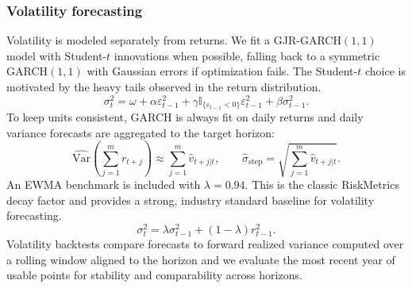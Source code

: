 \documentclass[11pt,a4paper]{article}
\begin{document}
\subsubsection{Volatility forecasting}
Volatility is modeled separately from returns. We fit a GJR-GARCH$(1,1)$ model with Student-$t$ innovations when possible, falling back to a symmetric GARCH$(1,1)$ with Gaussian errors if optimization fails. The Student-$t$ choice is motivated by the heavy tails observed in the return distribution.
\begin{equation}
\sigma_t^2 = \omega + \alpha \varepsilon_{t-1}^2 + \gamma \mathbb{I}_{\{\varepsilon_{t-1}<0\}}\varepsilon_{t-1}^2 + \beta \sigma_{t-1}^2.
\end{equation}
To keep units consistent, GARCH is always fit on daily returns and daily variance forecasts are aggregated to the target horizon:
\begin{equation}
\widehat{\mathrm{Var}}\left(\sum_{j=1}^{m} r_{t+j}\right) \approx \sum_{j=1}^{m} \hat v_{t+j|t},
\qquad
\hat\sigma_{\text{step}} = \sqrt{\sum_{j=1}^{m} \hat v_{t+j|t}}.
\end{equation}
An EWMA benchmark is included with $\lambda=0.94$. This is the classic RiskMetrics decay factor and provides a strong, industry standard baseline for volatility forecasting.
\begin{equation}
\sigma_t^2 = \lambda \sigma_{t-1}^2 + (1-\lambda) r_{t-1}^2.
\end{equation}
Volatility backtests compare forecasts to forward realized variance computed over a rolling window aligned to the horizon and we evaluate the most recent year of usable points for stability and comparability across horizons.
\end{document}

